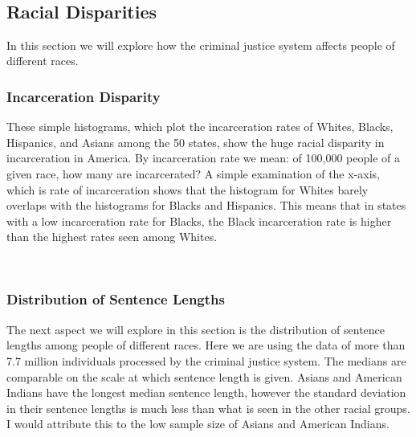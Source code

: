 \documentclass[11pt]{article}
\begin{document}
    \begin{center}
    \end{center}
    { \hspace*{\fill} \\}
    
    \hypertarget{racial-disparities}{%
\subsection{Racial Disparities}\label{racial-disparities}}

In this section we will explore how the criminal justice system affects
people of different races.

\hypertarget{incarceration-disparity}{%
\subsubsection{Incarceration Disparity}\label{incarceration-disparity}}

These simple histograms, which plot the incarceration rates of Whites,
Blacks, Hispanics, and Asians among the 50 states, show the huge racial
disparity in incarceration in America. By incarceration rate we mean: of
100,000 people of a given race, how many are incarcerated? A simple
examination of the x-axis, which is rate of incarceration shows that the
histogram for Whites barely overlaps with the histograms for Blacks and
Hispanics. This means that in states with a low incarceration rate for
Blacks, the Black incarceration rate is higher than the highest rates
seen among Whites.

    \begin{center}
    \end{center}
    { \hspace*{\fill} \\}
    
    \hypertarget{distribution-of-sentence-lengths}{%
\subsubsection{Distribution of Sentence
Lengths}\label{distribution-of-sentence-lengths}}

The next aspect we will explore in this section is the distribution of
sentence lengths among people of different races. Here we are using the
data of more than 7.7 million individuals processed by the criminal
justice system. The medians are comparable on the scale at which
sentence length is given. Asians and American Indians have the longest
median sentence length, however the standard deviation in their sentence
lengths is much less than what is seen in the other racial groups. I
would attribute this to the low sample size of Asians and American
Indians.
\end{document}
